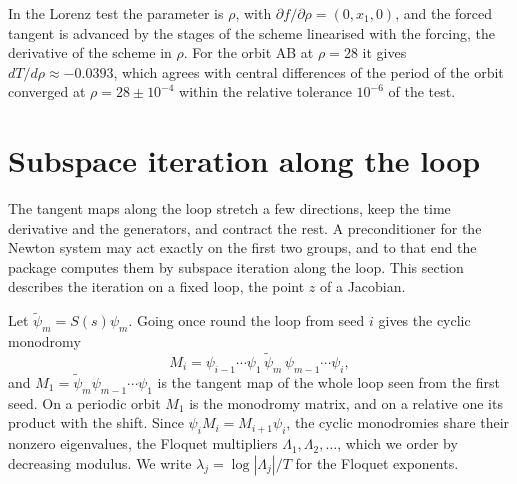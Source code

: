 \documentclass[11pt,a4paper]{article}
\begin{document}
In the Lorenz test the parameter is $\rho$, with $\partial f/\partial\rho = (0, x_1, 0)$, and the
forced tangent is advanced by the stages of the scheme linearised with the forcing, the derivative
of the scheme in $\rho$. For the orbit AB at $\rho = 28$ it gives $dT/d\rho \approx -0.0393$, which
agrees with central differences of the period of the orbit converged at $\rho = 28 \pm 10^{-4}$
within the relative tolerance $10^{-6}$ of the test.

\section{Subspace iteration along the loop}
\label{sec:subspace}

The tangent maps along the loop stretch a few directions, keep the time derivative and the
generators, and contract the rest. A preconditioner for the Newton system may act exactly on the
first two groups, and to that end the package computes them by subspace iteration along the loop.
This section describes the iteration on a fixed loop, the point $z$ of a Jacobian.

Let $\tilde\psi_m = S(s)\psi_m$. Going once round the loop from seed $i$ gives the cyclic monodromy
\begin{equation}
  M_i = \psi_{i-1} \cdots \psi_1\, \tilde\psi_m\, \psi_{m-1} \cdots \psi_i ,
\end{equation}
and $M_1 = \tilde\psi_m \psi_{m-1}\cdots\psi_1$ is the tangent map of the whole loop seen from the
first seed. On a periodic orbit $M_1$ is the monodromy matrix, and on a relative one its product
with the shift. Since $\psi_i M_i = M_{i+1} \psi_i$, the cyclic monodromies share their nonzero
eigenvalues, the Floquet multipliers $\Lambda_1, \Lambda_2, \dots$, which we order by decreasing
modulus. We write $\lambda_j = \log|\Lambda_j| / T$ for the Floquet exponents.
\end{document}
